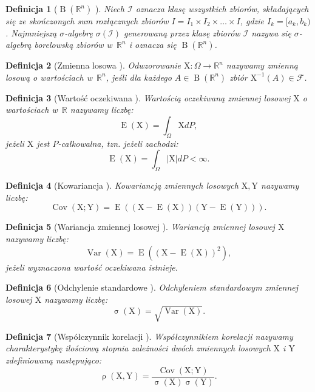 \documentclass[12pt,a4paper]{report}
\newtheorem{df}{Definicja}[chapter]
\newcommand{\setR}{\mathbb{R}}
\newcommand{\ro}[2]{\operatorname{\rho}\left( {#1},{#2} \right)}
\newcommand{\Covariance}[2]{\operatorname{Cov}\left({#1}; {#2} \right)}
\newcommand{\variance}[1]{\operatorname{Var}\left({#1} \right)}
\newcommand{\e}[1]{\operatorname{E}\left({#1} \right)}
\newcommand{\standard}[1]{\operatorname{\sigma}\left({#1} \right)}
\newcommand{\sigmacialo}[1]{\operatorname{B}\left({#1} \right)}
\begin{document}
\begin{df}[$\sigmacialo{\setR^n}$ {\citep[Sec 1.12]{wztp}}]
Niech $\mathcal{I}$ oznacza klasę wszystkich zbiorów, składających się ze skończonych sum rozłącznych zbiorów $\mathit{I} = \mathit{I}_1 \times \mathit{I}_2 \times \ldots \times \mathit{I}$, gdzie $\mathit{I}_k = [a_k,b_k)$.
Najmniejszą $\sigma$-algebrę $\sigma(\mathcal{I})$ generowaną przez klasę zbiorów $\mathcal{I}$ nazywa się $\sigma$-algebrą borelowską zbiorów w~$\setR^n$ i oznacza się $\sigmacialo{\setR^n}$.
\end{df}

\begin{df}[Zmienna losowa {\citep[Sec 5.1 Def. 1]{jakubowski}}]
Odwzorowanie $\mathrm{X}: \Omega \to \setR^n$ nazywamy zmienną losową o wartościach w~$\setR^n$, jeśli dla każdego $\mathit{A} \in \sigmacialo{\setR^n}$ zbiór $\mathrm{X}^{-1}(\mathit{A}) \in \mathcal{F}$.
\end{df}

\begin{df}[Wartość oczekiwana {\citep[Sec 5.6 Def. 2]{jakubowski}}]
Wartością oczekiwaną zmiennej losowej $\mathrm{X}$ o wartościach w~$\setR$ nazywamy liczbę:
$$
\e{\mathrm{X}} = \int_{\Omega} \mathrm{X} dP,
$$
jeżeli $\mathrm{X}$ jest $P$-całkowalna, tzn. jeżeli zachodzi:
$$
\e{\mathrm{X}} = \int_{\Omega} |\mathrm{X}| dP < \infty.
$$
\end{df}
\begin{df}[Kowariancja {\citep[Sec 2.8 Def.2.32]{wztp}}]
Kowariancją zmiennych losowych $\mathrm{X},\mathrm{Y}$ nazywamy liczbę:
$$
\Covariance{\mathrm{X}}{\mathrm{Y}} = \e{(\mathrm{X}-\e{\mathrm{X}})(\mathrm{Y}-\e{\mathrm{Y}})}.
$$
\end{df}

\begin{df}[Wariancja zmiennej losowej {\citep[Sec 2.8 Def.2.28]{wztp}}]
Wariancją zmiennej losowej $\mathrm{X}$ nazywamy liczbę:
$$
\variance{\mathrm{X}}=\e{(\mathrm{X}-\e{\mathrm{X}})^2},
$$
jeżeli wyznaczona wartość oczekiwana istnieje.
\end{df} 
\begin{df}[Odchylenie standardowe {\citep[Sec 2.8 Def.2.28]{wztp}}]
Odchyleniem standardowym zmiennej losowej $\mathrm{X}$ nazywamy liczbę:
$$
\standard{\mathrm{X}}=\sqrt{\variance{\mathrm{X}}}.
$$
\end{df}
\begin{df}[Współczynnik korelacji {\citep{wztp}}]
Współczynnikiem korelacji nazywamy charakterystykę ilościową stopnia zależności dwóch zmiennych losowych $\mathrm{X}$ i $\mathrm{Y}$ zdefiniowaną następująco:
$$
\ro{\mathrm{X}}{\mathrm{Y}} = \frac{\Covariance{\mathrm{X}}{\mathrm{Y}}}{\standard{\mathrm{X}} \standard{\mathrm{Y}}}.
$$
\end{df}
\end{document}
